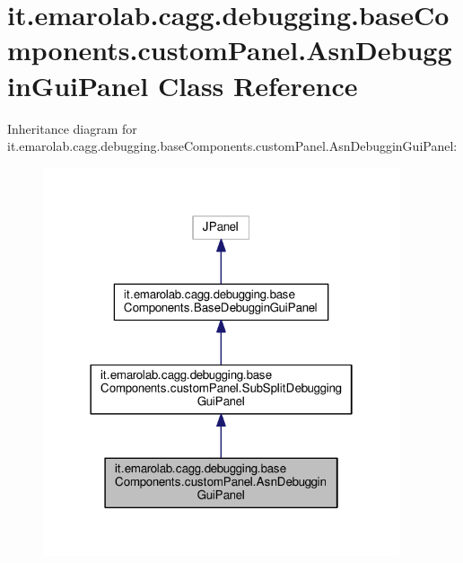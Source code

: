 \hypertarget{classit_1_1emarolab_1_1cagg_1_1debugging_1_1baseComponents_1_1customPanel_1_1AsnDebugginGuiPanel}{\section{it.\-emarolab.\-cagg.\-debugging.\-base\-Components.\-custom\-Panel.\-Asn\-Debuggin\-Gui\-Panel Class Reference}
\label{classit_1_1emarolab_1_1cagg_1_1debugging_1_1baseComponents_1_1customPanel_1_1AsnDebugginGuiPanel}
}


Inheritance diagram for it.\-emarolab.\-cagg.\-debugging.\-base\-Components.\-custom\-Panel.\-Asn\-Debuggin\-Gui\-Panel\-:\nopagebreak
\begin{figure}[H]
\begin{center}
\leavevmode
\includegraphics[width=298pt]{classit_1_1emarolab_1_1cagg_1_1debugging_1_1baseComponents_1_1customPanel_1_1AsnDebugginGuiPanel__inherit__graph}
\end{center}
\end{figure}


